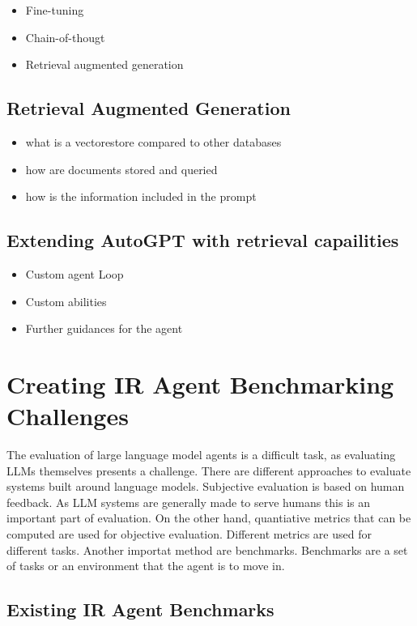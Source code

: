\documentclass[english, version-2022-01]{uzl-thesis}
\begin{document}
\begin{itemize}
	\item Fine-tuning
	\item Chain-of-thougt
	\item Retrieval augmented generation
\end{itemize}

\section{Retrieval Augmented Generation}

\begin{itemize}
	\item what is a vectorestore compared to other databases
	\item how are documents stored and queried
	\item how is the information included in the prompt
\end{itemize}


\section{Extending AutoGPT with retrieval capailities}

\begin{itemize}
	\item Custom agent Loop
	\item Custom abilities
	\item Further guidances for the agent
\end{itemize}

\chapter{Creating IR Agent Benchmarking Challenges}

The evaluation of large language model agents is a difficult task, as evaluating LLMs themselves presents a challenge. There are different approaches to evaluate systems built around language models. Subjective evaluation is based on human feedback. As LLM systems are generally made to serve humans this is an important part of evaluation. On the other hand, quantiative metrics that can be computed are used for objective evaluation. Different metrics are used for different tasks. Another importat method are benchmarks. Benchmarks are a set of tasks or an environment that the agent is to move in.

\section{Existing IR Agent Benchmarks}
\end{document}
